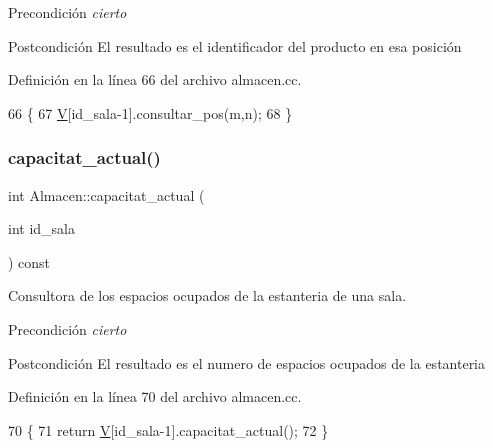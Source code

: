 \begin{DoxyPrecond}{Precondición}
{\itshape cierto} 
\end{DoxyPrecond}
\begin{DoxyPostcond}{Postcondición}
El resultado es el identificador del producto en esa posición 
\end{DoxyPostcond}


Definición en la línea 66 del archivo almacen.\+cc.


\begin{DoxyCode}
66                                                      \{
67   \mbox{\hyperlink{class_almacen_a76cad3a8f2f670e26d7ceb827f7f9e69}{V}}[id\_sala-1].consultar\_pos(m,n);
68 \}
\end{DoxyCode}
\mbox{\label{class_almacen_ab340c6592772278729f802dbb13a52d2}} 
\subsubsection{\texorpdfstring{capacitat\+\_\+actual()}{capacitat\_actual()}}
{\footnotesize\ttfamily int Almacen\+::capacitat\+\_\+actual (\begin{DoxyParamCaption}\item[{int}]{id\+\_\+sala }\end{DoxyParamCaption}) const}



Consultora de los espacios ocupados de la estanteria de una sala. 

\begin{DoxyPrecond}{Precondición}
{\itshape cierto} 
\end{DoxyPrecond}
\begin{DoxyPostcond}{Postcondición}
El resultado es el numero de espacios ocupados de la estanteria 
\end{DoxyPostcond}


Definición en la línea 70 del archivo almacen.\+cc.


\begin{DoxyCode}
70                                                \{
71   \textcolor{keywordflow}{return} \mbox{\hyperlink{class_almacen_a76cad3a8f2f670e26d7ceb827f7f9e69}{V}}[id\_sala-1].capacitat\_actual();
72 \}
\end{DoxyCode}
\mbox{\label{class_almacen_ad43c08da5df70f57bc9fe4da44a5d83c}} 

